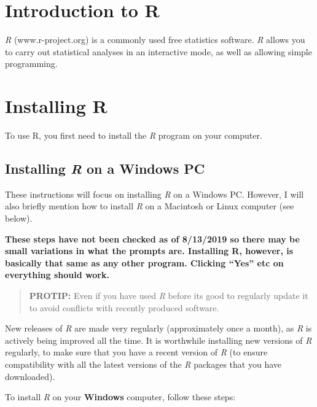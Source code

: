 \documentclass[
]{book}
\begin{document}
\hypertarget{introduction-to-r}{%
\section{Introduction to R}\label{introduction-to-r}}

\emph{R} (www.r-project.org) is a commonly used free statistics software. \emph{R} allows you to carry out statistical analyses in an interactive mode, as well as allowing simple programming.

\hypertarget{installing-r}{%
\section{Installing R}\label{installing-r}}

To use R, you first need to install the \emph{R} program on your computer.

\hypertarget{installing-r-on-a-windows-pc}{%
\subsection{\texorpdfstring{Installing \emph{R} on a Windows PC}{Installing R on a Windows PC}}\label{installing-r-on-a-windows-pc}}

These instructions will focus on installing \emph{R} on a Windows PC. However, I will also briefly mention how to install \emph{R} on a Macintosh or Linux computer (see below).

\textbf{These steps have not been checked as of 8/13/2019 so there may be small variations in what the prompts are. Installing R, however, is basically that same as any other program. Clicking ``Yes'' etc on everything should work.}

\begin{quote}
\textbf{PROTIP:} Even if you have used \emph{R} before its good to regularly update it to avoid conflicts with recently produced software.
\end{quote}

New releases of \emph{R} are made very regularly (approximately once a month), as \emph{R} is actively being improved all the time. It is worthwhile installing new versions of \emph{R} regularly, to make sure that you have a recent version of \emph{R} (to ensure compatibility with all the latest versions of the \emph{R} packages that you have downloaded).

To install \emph{R} on your \textbf{Windows} computer, follow these steps:
\end{document}
